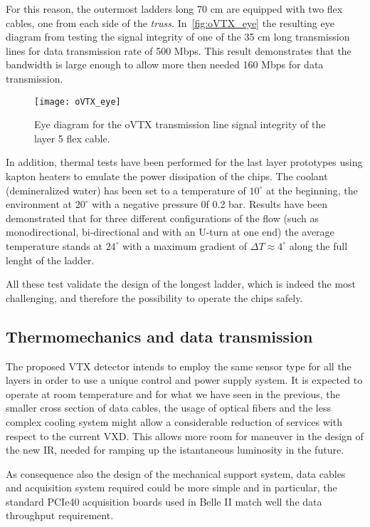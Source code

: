 For this reason, the outermost ladders long 70 cm are equipped with two flex cables, one from each side of the \textit{truss}. In~\autoref{fig:oVTX_eye} the resulting eye diagram from testing the signal integrity of one of the 35 cm long transmission lines for data transmission rate of 500 Mbps. This result demonstrates that the bandwidth is large enough to allow more then needed 160 Mbps for data transmission.


\begin{figure}[h!]
\centering
\texttt{[image: oVTX\_eye]}
\caption{Eye diagram for the oVTX transmission line signal integrity of the layer 5 flex cable.}
\label{fig:oVTX_eye}
\end{figure}


In addition, thermal tests have been performed for the last layer prototypes using kapton heaters to emulate the power dissipation of the chips. The coolant (demineralized water) has been set to a temperature of $10^{\circ}$ at the beginning, the environment at $20^{\circ}$ with a negative pressure 0f 0.2 bar. Results have been demonstrated that for three different configurations of the flow (such as monodirectional, bi-directional and with an U-turn at one end) the average temperature stands at $24^{\circ}$ with a maximum gradient of $\Delta T \approx 4^{\circ}$ along the full lenght of the ladder. 

All these test validate the design of the longest ladder, which is indeed the most challenging, and therefore the possibility to operate the chips safely.


\subsection{Thermomechanics and data transmission}

The proposed VTX detector intends to employ the same sensor type for all the layers in order to use a unique control and power supply system. It is expected to operate at room temperature and for what we have seen in the previous, the smaller cross section of data cables, the usage of optical fibers and the less complex cooling system might allow a considerable reduction of services with respect to the current VXD. This allows more room for maneuver in the design of the new IR, needed for ramping up the istantaneous luminosity in the future.

As consequence also the design of the mechanical support system, data cables and acquisition system required could be more simple and in particular, the standard PCIe40 acquisition boards used in Belle II match well the data throughput requirement.

